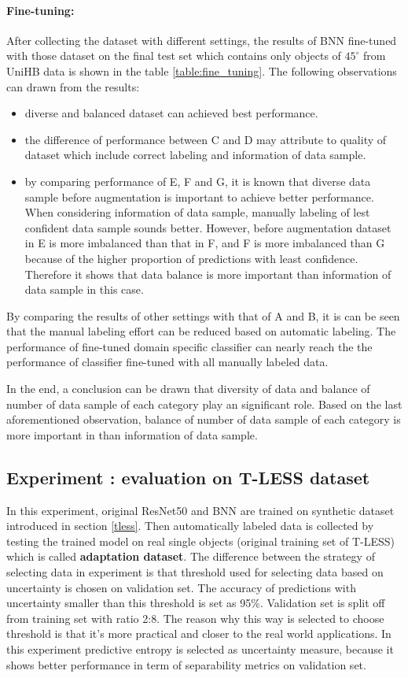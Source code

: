 \paragraph{Fine-tuning:} After collecting the dataset with different settings, the results of \gls{BNN} fine-tuned with those dataset on the final test set which contains only objects of $45^{\circ}$ from UniHB data is shown in the table \ref{table:fine_tuning}. The following observations can drawn from the results:
\begin{itemize}
	\item diverse and balanced dataset can achieved best performance.
	\item the difference of performance between C and D may attribute to quality of dataset which include correct labeling and information of data sample.
	\item by comparing performance of E, F and G, it is known that diverse data sample before augmentation is important to achieve better performance. When considering information of data sample, manually labeling of lest confident data sample sounds better. However, before augmentation dataset in E is more imbalanced than that in F, and F is more imbalanced than G because of the higher proportion of predictions with least confidence. Therefore it shows that data balance is more important than information of data sample in this case.
\end{itemize}
By comparing the results of other settings with that of A and B, it is can be seen that the manual labeling effort can be reduced based on automatic labeling.  The performance of fine-tuned domain specific classifier can nearly reach the the performance of classifier fine-tuned with all manually labeled data. 

In the end, a conclusion can be drawn that diversity of data and balance of number of data sample of each category play an significant role. Based on the last aforementioned observation, balance of number of data sample of each category is more important in than information of data sample.

\subsection{Experiment : evaluation on T-LESS dataset} \label{con_learn_tless}
In this experiment, original ResNet50 and \gls{BNN} are trained on synthetic dataset introduced in section \ref{tless}. Then automatically labeled data is collected by testing the trained model on real single objects (original training set of T-LESS) which is called \textbf{adaptation dataset}. The difference between the strategy of selecting data in experiment  is that threshold used for selecting data based on uncertainty is chosen on validation set. The accuracy of predictions with uncertainty smaller than this threshold is set as 95\%. Validation set is split off from training set with ratio 2:8. The reason why this way is selected to choose threshold is that it's more practical and closer to the real world applications. In this experiment predictive entropy is selected as uncertainty measure, because it shows better performance in term of separability metrics on validation set.

